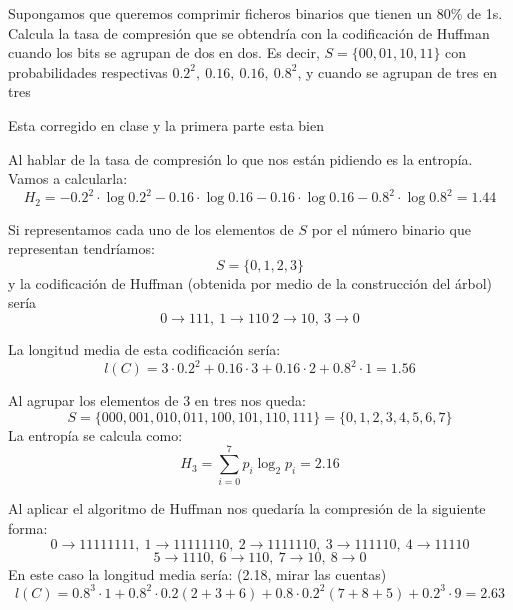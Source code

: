 \begin{problem}[13]
Supongamos que queremos comprimir ficheros binarios que tienen un 80\% de 1s. Calcula la tasa de compresión que se obtendría con la codificación de Huffman cuando los bits se agrupan de dos en dos. Es decir, $S=\{00,01,10,11\}$ con probabilidades respectivas $0.2^2, \ 0.16, \ 0.16, \ 0.8^2$, y cuando se agrupan de tres en tres
\solution

\yoP Esta corregido en clase y la primera parte esta bien

Al hablar de la tasa de compresión lo que nos están pidiendo es la entropía. Vamos a calcularla:
\[H_2=-0.2^2 \cdot  \log 0.2^2-0.16\cdot \log 0.16 -0.16\cdot \log 0.16- 0.8^2\cdot \log 0.8^2 = 1.44\]

Si representamos cada uno de los elementos de $S$ por el número binario que representan tendríamos:
\[S=\{0,1,2,3\}\]
y la codificación de Huffman (obtenida por medio de la construcción del árbol) sería
\[0 \to 111, \  1\to 110 \ 2 \to 10, \ 3 \to  0\]

La longitud media de esta codificación sería:
\[l(C)=3\cdot 0.2^2+0.16\cdot 3+0.16\cdot 2+0.8^2\cdot 1 = 1.56\]

Al agrupar los elementos de 3 en tres nos queda:
\[S=\{000,001,010,011,100,101,110,111\} = \{0,1,2,3,4,5,6,7\}\]
La entropía se calcula como:
\[H_3=\sum_{i=0}^7 p_i\log_2 p_i =2.16\]

Al aplicar el algoritmo de Huffman nos quedaría la compresión de la siguiente forma:
\[0 \to 11111111, \ 1 \to 11111110, \ 2 \to 1111110, \ 3 \to 111110, \ 4\to 11110\]
\[5\to 1110, \ 6 \to 110, \ 7\to 10, \ 8 \to 0\]
En este caso la longitud media sería: (2.18, mirar las cuentas)
\[l(C)=0.8^3\cdot 1+0.8^2\cdot 0.2(2+3+6)+0.8\cdot 0.2^2(7+8+5)+0.2^3\cdot 9=2.63\]

\end{problem}

